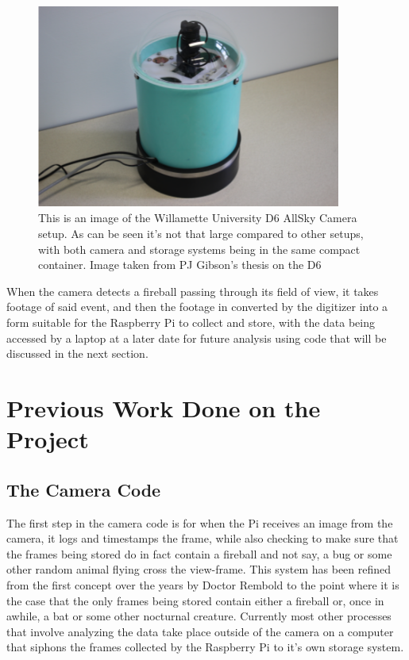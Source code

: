 \begin{figure}
    \centering
    \includegraphics[width=10cm]{D6-Camera.png}
    \caption{This is an image of the Willamette University D6 AllSky Camera setup. As can be seen it's not that large compared to other setups, with both camera and storage systems being in the same compact container. Image taken from PJ Gibson's thesis on the D6 \cite{Gibson}}
    \label{Figure 6}
\end{figure}

When the camera detects a fireball passing through its field of view, it takes footage of said event, and then the footage in converted by the digitizer into a form suitable for the Raspberry Pi to collect and store, with the data being accessed by a laptop at a later date for future analysis using code that will be discussed in the next section.

\section{Previous Work Done on the Project}

\subsection{The Camera Code}
The first step in the camera code is for when the Pi receives an image from the camera, it logs and timestamps the frame, while also checking to make sure that the frames being stored do in fact contain a fireball and not say, a bug or some other random animal flying cross the view-frame\cite{McSwain}.
This system has been refined from the first concept over the years by Doctor Rembold to the point where it is the case that the only frames being stored contain either a fireball or, once in awhile, a bat or some other nocturnal creature.
Currently most other processes that involve analyzing the data take place outside of the camera on a computer that siphons the frames collected by the Raspberry Pi to it's own storage system.

